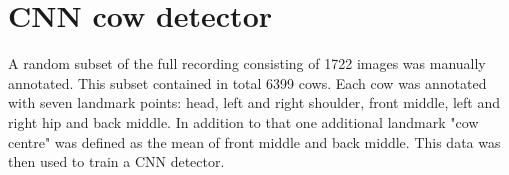\documentclass[10pt,a4paper,twocolumn]{article}
\begin{document}
%
%
%

\section{CNN cow detector}

A random subset of the full recording consisting of 1722 images was manually annotated. This subset contained in total 6399 cows. Each cow was annotated with seven landmark points: head, left and right shoulder, front middle, left and right hip and back middle. In addition to that one additional landmark "cow centre" was defined as the mean of front middle and back middle. This data was then used to train a CNN detector.
\end{document}

